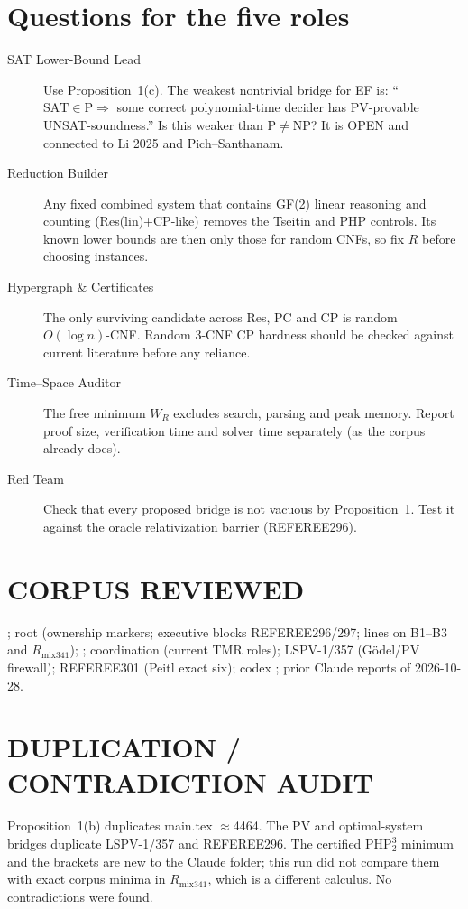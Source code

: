 \documentclass[11pt]{article}
\begin{document}
\section{Questions for the five roles}
\begin{description}
\item[SAT Lower-Bound Lead] Use Proposition~1(c). The weakest nontrivial bridge for EF is:
``$\mathrm{SAT}\in\mathrm P\Rightarrow$ some correct polynomial-time decider has
PV-provable UNSAT-soundness.'' Is this weaker than $\mathrm P\ne\mathrm{NP}$?
It is OPEN and connected to Li 2025 and Pich--Santhanam.
\item[Reduction Builder] Any fixed combined system that contains GF(2) linear
reasoning and counting (Res(lin)+CP-like) removes the Tseitin and PHP controls.
Its known lower bounds are then only those for random CNFs, so fix $R$ before choosing instances.
\item[Hypergraph \& Certificates] The only surviving candidate across Res, PC and CP is
random $O(\log n)$-CNF. Random 3-CNF CP hardness should be checked against current literature before any reliance.
\item[Time--Space Auditor] The free minimum $W_R$ excludes search, parsing and
peak memory. Report proof size, verification time and solver time separately (as the corpus already does).
\item[Red Team] Check that every proposed bridge is not vacuous by
Proposition~1. Test it against the oracle relativization barrier (REFEREE296).
\end{description}

\section*{CORPUS REVIEWED}
; root  (ownership markers; executive blocks REFEREE296/297;
lines on B1--B3 and $R_{\mathrm{mix341}}$); ; coordination
 (current TMR roles);
LSPV-1/357 (Gödel/PV firewall); REFEREE301 (Peitl exact six); codex
; prior Claude reports of 2026-10-28.
\section*{DUPLICATION / CONTRADICTION AUDIT}
Proposition~1(b) duplicates main.tex $\approx$4464. The PV and optimal-system bridges
duplicate LSPV-1/357 and REFEREE296. The certified $\mathrm{PHP}^3_2$ minimum and the
brackets are new to the Claude folder; this run did not compare them with exact
corpus minima in $R_{\mathrm{mix341}}$, which is a different calculus. No contradictions were found.
\end{document}
